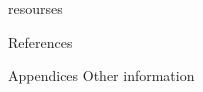 \documentclass{beamer}
\begin{document}
\begin{frame}{resourses}
\end{frame}

\begin{frame}{References}
    
\end{frame}



\begin{frame}{Appendices}
    Other information
\end{frame}

% 
\end{document}
